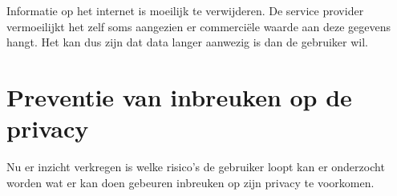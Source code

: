 Informatie op het internet is moeilijk te verwijderen. De service provider vermoeilijkt het zelf soms aangezien er commerci\"ele waarde aan deze gegevens hangt. Het kan dus zijn dat data langer aanwezig is dan de gebruiker wil.


\section{Preventie van inbreuken op de privacy}
Nu er inzicht verkregen is welke risico's de gebruiker loopt kan er onderzocht worden wat er kan doen gebeuren inbreuken op zijn privacy te voorkomen.






